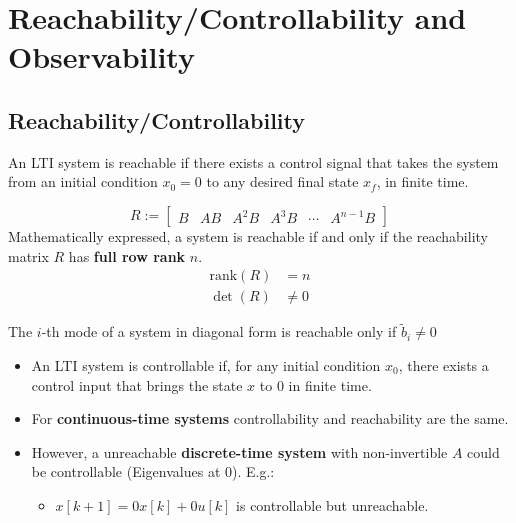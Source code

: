 \section{Reachability/Controllability and Observability}

\subsection{Reachability/Controllability}

An LTI system is reachable if there exists a control signal that takes the system from an initial condition $x_0 = 0$ to any desired final state $x_f$, in finite time.

\begin{equation*}
    R:= \begin{bmatrix}
        B & AB & A^2B & A^3B & \cdots & A^{n-1}B
    \end{bmatrix}
\end{equation*}
Mathematically expressed, a system is reachable if and only if the reachability matrix $R$ has \textbf{full row rank} $n$.
\begin{align*}
    \text{rank}(R) & = n    \\
    \det(R)        & \neq 0
\end{align*}


The $i$-th mode of a system in diagonal form is reachable only if $\tilde{b}_i \neq 0$


\begin{itemize}
    \item An LTI system is controllable if, for any initial condition $x_0$, there exists a control input that brings the state $x$ to $0$ in finite time.
    \item For \textbf{continuous-time systems} controllability and reachability are the same.
    \item However, a unreachable \textbf{discrete-time system} with non-invertible $A$ could be controllable (Eigenvalues at 0). E.g.:
    \begin{itemize}
        \item $x[k+1] = 0x[k] + 0u[k]$ is controllable but unreachable.
    \end{itemize}
\end{itemize}


